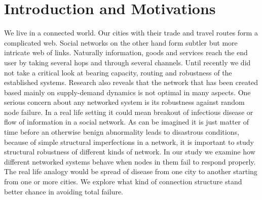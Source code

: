 \documentclass[11pt]{article}
\begin{document}
\section{Introduction and Motivations}
We live in a connected world. Our cities with their trade and travel routes form a complicated web. Social networks on the other hand form subtler but more intricate web of links. Naturally information, goods and services reach the end user by taking several hops and through several channels. Until recently we did not take a critical look at bearing capacity, routing and robustness of the established systems. Research also reveals that the network that has been created based mainly on supply-demand dynamics is not optimal in many aspects. One serious concern about any networked system is its robustness against random node failure. In a real life setting it could mean breakout of infectious disease or flow of information in a social network. As can be imagined it is just matter of time before an otherwise benign abnormality leads to disastrous conditions, because of simple structural imperfections in a network, it is important to study structural robustness of different kinds of network. In our study we examine how different networked systems behave when nodes in them fail to respond properly. The real life analogy would be spread of disease from one city to another starting from one or more cities. We explore what kind of connection structure stand better chance in avoiding total failure.
\end{document}
